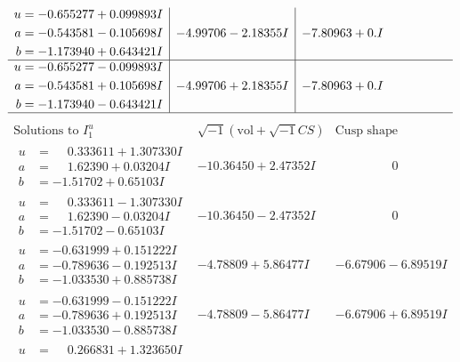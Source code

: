 \documentclass[1p]{elsarticle_modified}
\theoremstyle{definition}
\newcommand{\I}{\sqrt{-1}}
\begin{document}
$$\begin{array}{c|c|c}
\begin{aligned}
u &= -0.655277 + 0.099893 I \\
a &= -0.543581 - 0.105698 I \\
b &= -1.173940 + 0.643421 I\end{aligned}
 & -4.99706 - 2.18355 I & -7.80963 + 0. I\phantom{ +0.000000I} \\ \hline\begin{aligned}
u &= -0.655277 - 0.099893 I \\
a &= -0.543581 + 0.105698 I \\
b &= -1.173940 - 0.643421 I\end{aligned}
 & -4.99706 + 2.18355 I & -7.80963 + 0. I\phantom{ +0.000000I}\\
 \hline 
 \end{array}$$\newpage$$\begin{array}{c|c|c}  
\text{Solutions to }I^u_{1}& \I (\text{vol} + \sqrt{-1}CS) & \text{Cusp shape}\\
 \hline 
\begin{aligned}
u &= \phantom{-}0.333611 + 1.307330 I \\
a &= \phantom{-}1.62390 + 0.03204 I \\
b &= -1.51702 + 0.65103 I\end{aligned}
 & -10.36450 + 2.47352 I & \phantom{-0.000000 } 0 \\ \hline\begin{aligned}
u &= \phantom{-}0.333611 - 1.307330 I \\
a &= \phantom{-}1.62390 - 0.03204 I \\
b &= -1.51702 - 0.65103 I\end{aligned}
 & -10.36450 - 2.47352 I & \phantom{-0.000000 } 0 \\ \hline\begin{aligned}
u &= -0.631999 + 0.151222 I \\
a &= -0.789636 - 0.192513 I \\
b &= -1.033530 + 0.885738 I\end{aligned}
 & -4.78809 + 5.86477 I & -6.67906 - 6.89519 I \\ \hline\begin{aligned}
u &= -0.631999 - 0.151222 I \\
a &= -0.789636 + 0.192513 I \\
b &= -1.033530 - 0.885738 I\end{aligned}
 & -4.78809 - 5.86477 I & -6.67906 + 6.89519 I \\ \hline\begin{aligned}
u &= \phantom{-}0.266831 + 1.323650 I \\

\end{aligned}
\end{array}$$
\end{document}
